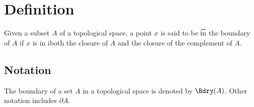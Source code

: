 
\section*{Definition}

Given a subset $A$ of a topological space, a point $x$ is said to be \t{in the boundary of} $A$ if $x$ is in iboth the closure of $A$ and the closure of the complement of $A$.

\subsection*{Notation}

The boundary of a set $A$ in a topological space is denoted by $\Bdry(A)$.
Other notation includes $\partial A$.

\blankpage
